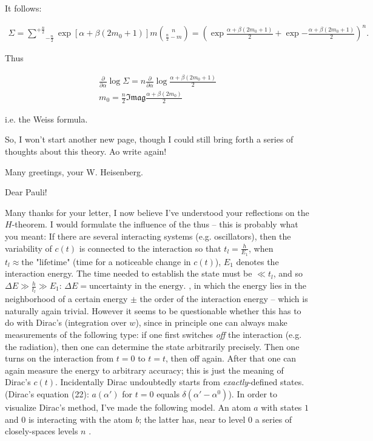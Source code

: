 \documentclass{article}
\newcommand{\uequ}[1]{
\begin{align*}
#1
\end{align*}
}
\newcommand{\sumXY}[2]{\underset{#1}{\overset{#2}{\sum}}}
\begin{document}
It follows:
\uequ{
\Sigma = \sumXY{-\frac{n}{2}}{+\frac{n}{2}} 
\exp{[\alpha + \beta(2m_0 + 1)]m}
\binom{n}{\frac{n}{2}-m} = \left(
\exp{\frac{\alpha + \beta(2m_0 + 1)}{2}} +
\exp{-\frac{\alpha + \beta(2m_0 + 1)}{2}}
\right)^n.
}
Thus
\uequ{
\frac{\partial}{\partial\alpha}\log{\Sigma} = 
n\frac{\partial}{\partial\alpha}\log{\frac{\alpha + \beta(2m_0 + 1)}{2}}\\
m_0 = \frac{n}{2}\mathfrak{Imag}{\frac{\alpha + \beta(2m_0)}{2}}
}
i.e. the Weiss formula.

So, I won't start another new page, though I could still bring forth a series of thoughts about this theory. Ao write again!

Many greetings, your W. Heisenberg.

\date{June 13, 1928}

Dear Pauli!

Many thanks for your letter, I now believe I've understood your reflections on the $H$-theorem. I would formulate the influence of the  thus -- this is probably what you meant: If there are several interacting systems (e.g. oscillators), then the variability of $c(t)$ is connected to the interaction so that $t_l = \frac{h}{E_1}$, when $t_l \approx \text{the "lifetime"}$ (time for a noticeable change in $c(t)$), $E_1$ denotes the interaction energy. The time needed to establish the state must be $\ll t_l$, and so $\Delta E \gg \frac{h}{t_l} \gg E_1$: $\Delta E =\text{uncertainty in the energy}$. , in which the energy lies in the neighborhood of a certain energy $\pm$ the order of the interaction energy -- which is naturally again trivial. However it seems to be questionable whether this  has to do with Dirac's  (integration over $w$), since in principle one can always make measurements of the following type: if one first switches \textit{off} the interaction (e.g. the radiation), then one can determine the state arbitrarily precisely. Then one turns on the interaction from $t=0$ to $t=t$, then off again. After that one can again measure the energy to arbitrary accuracy; this is just the meaning of Dirac's $c(t)$. Incidentally Dirac undoubtedly starts from \textit{exactly}-defined states. (Dirac's equation (22): $a(\alpha')$ for $t=0$ equals $\delta(\alpha'-\alpha^0)$). In order to visualize Dirac's method, I've made the following model. An atom $a$ with states $1$ and $0$ is interacting with the atom $b$; the latter has, near to level $0$ a series of closely-spaces levels $n$ .
\end{document}
